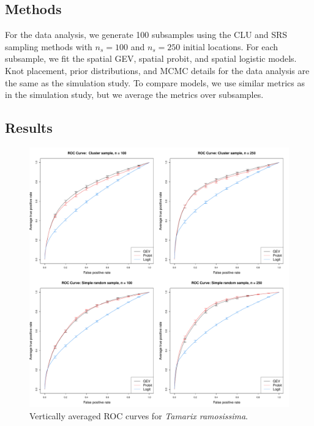 \documentclass[11pt]{article}
\begin{document}
\subsection{Methods} \label{rbs:datamethods}
For the data analysis, we generate 100 subsamples using the CLU and SRS sampling methods with $n_s = 100$ and $n_s = 250$ initial locations.
For each subsample, we fit the spatial GEV, spatial probit, and spatial logistic models.
Knot placement, prior distributions, and MCMC details for the data analysis are the same as the simulation study.
To compare models, we use similar metrics as in the simulation study, but we average the metrics over subsamples.

\subsection{Results}\label{rbs:dataresults}

\begin{figure}
  \includegraphics[width=\linewidth]{plots/data-perf-species1}
  \caption{Vertically averaged ROC curves for \emph{Tamarix ramosissima}.}
  \label{rbfig:simrocgev}
\end{figure}
\end{document}
